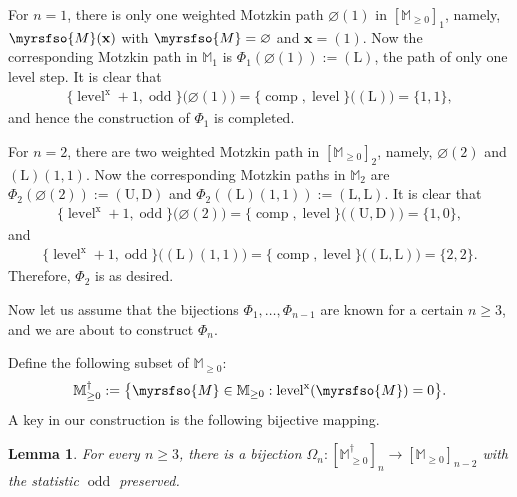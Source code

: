 \documentclass[12pt,reqno]{amsart}
\numberwithin{equation}{section}
\theoremstyle{theorem}
\newtheorem{lemma}[theorem]{Lemma}
\theoremstyle{definition}
\theoremstyle{named}
\newcommand{\odd}{\operatorname{odd}}
\newcommand{\comp}{\operatorname{comp}}
\newcommand{\level}{\operatorname{level}}
\newcommand{\x}{\operatorname{x}}
\newcommand{\cM}{\myrsfso{M}}
\newcommand{\bbM}{\mathbb{M}}
\newcommand{\bfx}{\mathbf{x}}
\newcommand{\rU}{\mathrm{U}}
\newcommand{\rD}{\mathrm{D}}
\newcommand{\rL}{\mathrm{L}}
\begin{document}
For $n=1$, there is only one weighted Motzkin path $\varnothing(1)$ in $[\bbM_{\ge 0}]_1$, namely, $\cM(\bfx)$ with $\cM=\varnothing$ and $\bfx=(1)$. Now the corresponding Motzkin path in $\bbM_1$ is $\Phi_1(\varnothing(1)) := (\rL)$, the path of only one level step. It is clear that
\begin{align*}
	\{\level^{\x}+1,\odd\}\big(\varnothing(1)\big) = \{\comp,\level\} \big((\rL)\big) = \{1,1\},
\end{align*}
and hence the construction of $\Phi_1$ is completed.

For $n=2$, there are two weighted Motzkin path in $[\bbM_{\ge 0}]_2$, namely, $\varnothing(2)$ and $(\rL)(1,1)$. Now the corresponding Motzkin paths in $\bbM_2$ are $\Phi_2(\varnothing(2)) := (\rU,\rD)$ and $\Phi_2((\rL)(1,1)) := (\rL,\rL)$. It is clear that
\begin{align*}
	\{\level^{\x}+1,\odd\}\big(\varnothing(2)\big) = \{\comp,\level\} \big((\rU,\rD)\big) = \{1,0\},
\end{align*}
and
\begin{align*}
	\{\level^{\x}+1,\odd\}\big((\rL)(1,1)\big) = \{\comp,\level\} \big((\rL,\rL)\big) = \{2,2\}.
\end{align*}
Therefore, $\Phi_2$ is as desired.

Now let us assume that the bijections $\Phi_1,\ldots,\Phi_{n-1}$ are known for a certain $n\ge 3$, and we are about to construct $\Phi_n$.

Define the following subset of $\bbM_{\ge 0}$:
\begin{align*}
	\bbM_{\ge 0}^\dagger := \big\{\cM\in \bbM_{\ge 0}: \level^{\x}(\cM) = 0\big\}.
\end{align*}
A key in our construction is the following bijective mapping.

\begin{lemma}\label{le:key-dagger}
	For every $n\ge 3$, there is a bijection $\Omega_n : [\bbM_{\ge 0}^\dagger]_n \to [\bbM_{\ge 0}]_{n-2}$ with the statistic $\odd$ preserved.
\end{lemma}
\end{document}

